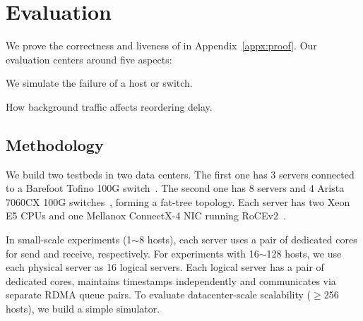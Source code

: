 \section{Evaluation}
\label{sec:evaluation}

We prove the correctness and liveness of \sys in Appendix~\ref{appx:proof}.
Our evaluation centers around five aspects:




 We simulate the failure of a host or switch.

 How background traffic affects reordering delay.



\subsection{Methodology}
\label{sec:testbed}

We build two testbeds in two data centers.
The first one has 3 servers connected to a Barefoot Tofino 100G switch~\cite{tofino}.
The second one has 8 servers and 4 Arista 7060CX 100G switches~\cite{arista}, forming a fat-tree topology.
Each server has two Xeon E5 CPUs and one Mellanox ConnectX-4 NIC running RoCEv2~\cite{infinibandrocev2}.


In small-scale experiments (1$\sim$8 hosts), each server uses a pair of dedicated cores for send and receive, respectively.
For experiments with 16$\sim$128 hosts, we use each physical server as 16 logical servers. Each logical server has a pair of dedicated cores, maintains timestamps independently and communicates via separate RDMA queue pairs.
To evaluate datacenter-scale scalability ($\ge$256 hosts), we build a simple simulator.


